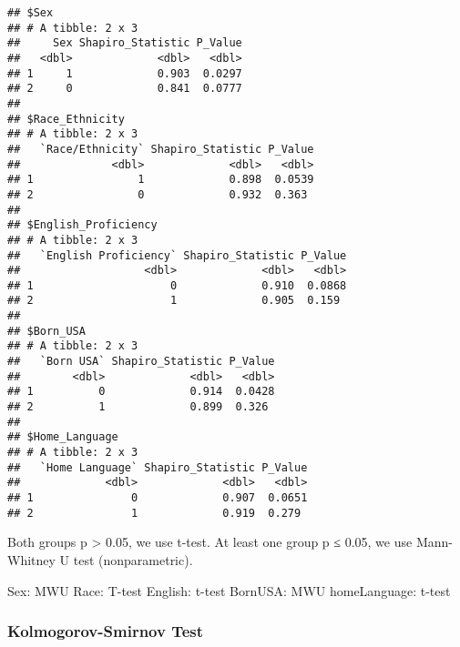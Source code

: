 \documentclass[
]{article}
\begin{document}
\begin{verbatim}
## $Sex
## # A tibble: 2 x 3
##     Sex Shapiro_Statistic P_Value
##   <dbl>             <dbl>   <dbl>
## 1     1             0.903  0.0297
## 2     0             0.841  0.0777
## 
## $Race_Ethnicity
## # A tibble: 2 x 3
##   `Race/Ethnicity` Shapiro_Statistic P_Value
##              <dbl>             <dbl>   <dbl>
## 1                1             0.898  0.0539
## 2                0             0.932  0.363 
## 
## $English_Proficiency
## # A tibble: 2 x 3
##   `English Proficiency` Shapiro_Statistic P_Value
##                   <dbl>             <dbl>   <dbl>
## 1                     0             0.910  0.0868
## 2                     1             0.905  0.159 
## 
## $Born_USA
## # A tibble: 2 x 3
##   `Born USA` Shapiro_Statistic P_Value
##        <dbl>             <dbl>   <dbl>
## 1          0             0.914  0.0428
## 2          1             0.899  0.326 
## 
## $Home_Language
## # A tibble: 2 x 3
##   `Home Language` Shapiro_Statistic P_Value
##             <dbl>             <dbl>   <dbl>
## 1               0             0.907  0.0651
## 2               1             0.919  0.279
\end{verbatim}

Both groups p \textgreater{} 0.05, we use t-test. At least one group p ≤
0.05, we use Mann-Whitney U test (nonparametric).

Sex: MWU Race: T-test English: t-test BornUSA: MWU homeLanguage: t-test

\subsubsection{Kolmogorov-Smirnov Test}\label{kolmogorov-smirnov-test}
\end{document}
